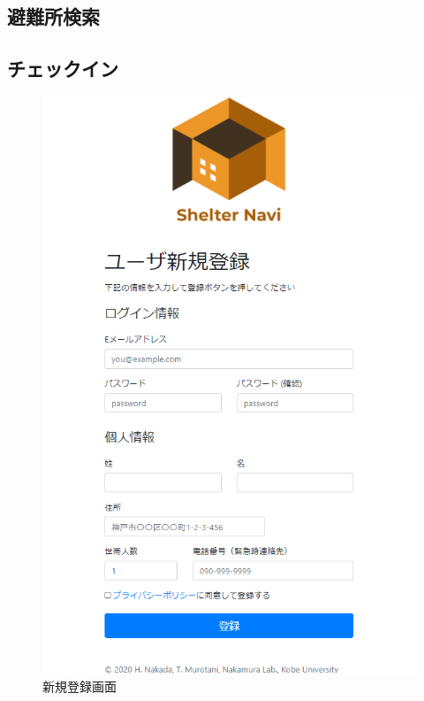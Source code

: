 \documentclass[technicalreport,dvipdfmx]{ieicej}
\begin{document}
\subsection{避難所検索}

\subsection{チェックイン}

\begin{figure}[htbp]
     \begin{center}
          \includegraphics[scale=0.5,pagebox=cropbox,clip]{signup.png}
          \caption{新規登録画面}
          \label{fig:signup}
     \end{center}
\end{figure}
\end{document}
